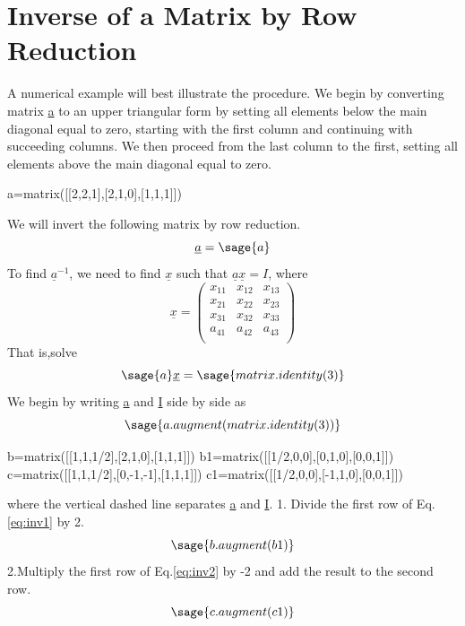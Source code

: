 \documentclass[12pt]{report}
\newcommand{\lab}[1]{
Eq.\ref{#1}
}
\begin{document}
\section{Inverse of a Matrix by Row Reduction}\label{last}
A numerical example will best illustrate the procedure. We begin by
converting matrix \underline{a} to an upper triangular form by setting
all elements below the main diagonal equal to zero, starting with the
first column and continuing with succeeding columns. We then proceed
from the last column to the first, setting all elements above the main
diagonal equal to zero.
\begin{sagesilent}
a=matrix([[2,2,1],[2,1,0],[1,1,1]])
\end{sagesilent}
We will invert the following matrix by row reduction.
\begin{equation}\underline{a} = \sage{a}\end{equation}
To find $\underline{a}^{-1}$, we need to find $\underline{x}$ such that
$\underline{a}\underline{x}=I$, where
\begin{equation}\underline{x}=\left(\begin{array}{rrr}
x_{11} & x_{12} & x_{13} \\
x_{21} & x_{22} & x_{23} \\
x_{31} & x_{32} & x_{33} \\
a_{41} & a_{42} & a_{43}  \\
\end{array}\right)\end{equation}
That is,solve\begin{equation} \sage{a}\underline{x} = \sage{matrix.identity(3)}\end{equation}
We begin by writing \underline{a} and \underline{I} side by side as
\begin{equation}\sage{a.augment(matrix.identity(3))}\label{eq:inv1}\end{equation}
\begin{sagesilent}
b=matrix([[1,1,1/2],[2,1,0],[1,1,1]])
b1=matrix([[1/2,0,0],[0,1,0],[0,0,1]])
c=matrix([[1,1,1/2],[0,-1,-1],[1,1,1]])
c1=matrix([[1/2,0,0],[-1,1,0],[0,0,1]])
\end{sagesilent}
where the vertical dashed line separates \underline{a} and \underline{I}.
1. Divide the first row of \lab{eq:inv1} by 2.
\begin{equation}\sage{b.augment(b1)}\label{eq:inv2}\end{equation}
2.Multiply the first row of \lab{eq:inv2} by -2 and add the result to
the second row.
\begin{equation}\sage{c.augment(c1)}\label{eq:inv3}\end{equation}
\end{document}
